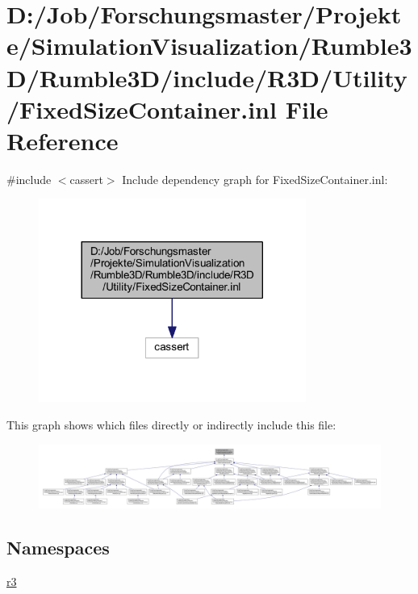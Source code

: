 \hypertarget{_fixed_size_container_8inl}{}\section{D\+:/\+Job/\+Forschungsmaster/\+Projekte/\+Simulation\+Visualization/\+Rumble3\+D/\+Rumble3\+D/include/\+R3\+D/\+Utility/\+Fixed\+Size\+Container.inl File Reference}
\label{_fixed_size_container_8inl}
{\ttfamily \#include $<$cassert$>$}\newline
Include dependency graph for Fixed\+Size\+Container.\+inl\+:\nopagebreak
\begin{figure}[H]
\begin{center}
\leavevmode
\includegraphics[width=248pt]{_fixed_size_container_8inl__incl}
\end{center}
\end{figure}
This graph shows which files directly or indirectly include this file\+:\nopagebreak
\begin{figure}[H]
\begin{center}
\leavevmode
\includegraphics[width=350pt]{_fixed_size_container_8inl__dep__incl}
\end{center}
\end{figure}
\subsection*{Namespaces}
\begin{DoxyCompactItemize}
\item 
 \mbox{\hyperlink{namespacer3}{r3}}
\end{DoxyCompactItemize}
